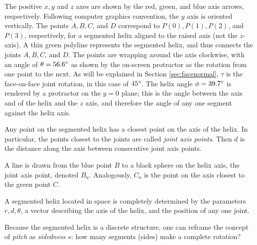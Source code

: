 \documentclass{svproc}
\begin{document}
The positive $x,y$ and $z$ axes are shown by the red, green, and blue axis arrows, respectively.
Following computer graphics convention, the $y$ axis is oriented vertically.
The points $A,B,C$, and $D$ correspond to $P(0), P(1), P(2)$, and $ P(3)$, respectively,
for a segmented helix aligned
to the raised axis (not the $z$-axis).
A thin green polyline represents the segmented helix, and thus connects the joints $A,B,C$, and $D$.
The points are wrapping around the axis clockwise, with an angle of $\theta = 56.6 \degree$ as
shown by the on-screen protractor as the rotation from one point to the next. As will be explained in Section \ref{sec:facenormal},
$\tau$ is the face-on-face joint rotation, in this case of $45 \degree$.
The helix angle $\phi = 39.7 \degree$ is rendered by a protractor on the $y = 0$ plane;
this is the angle between the axis
and of the helix and the $z$ axis, and therefore the angle of any one segment against the helix axis.

Any point on the segmented helix has a closest point on the axis of the helix.
In particular, the points closest to the
joints are called {\em joint axis points}.
Then $d$ is the distance along the axis between consecutive joint axis points.

A line is drawn from the blue point $B$ to a black sphere on the helix axis,
the joint axis point, denoted $B_a$. Analogously, $C_a$ is the point
on the axis closest to the green point $C$.


A segmented helix located in space is completely determined by
the parameters $r,d,\theta$,
a vector describing the axis
of the helix, and the position of any one joint.

Because the segmented helix is a discrete structure, one can reframe the concept of {\em pitch} as {\em sidedness $s$}:
how many segments (sides)
make a complete rotation?
\end{document}
